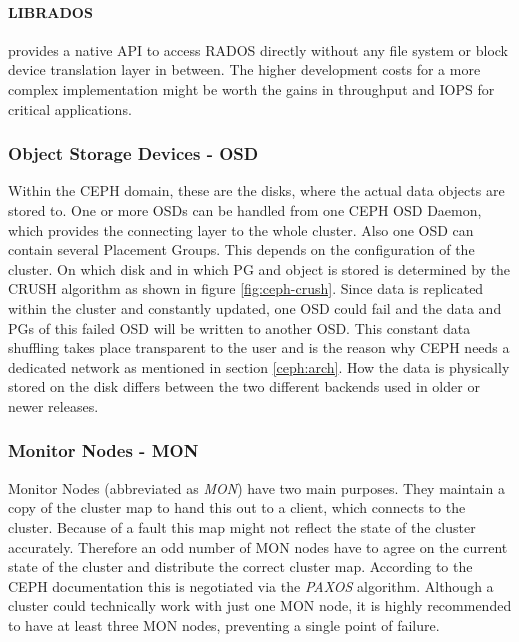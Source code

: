 \documentclass[titlepage, a4paper, 11pt]{scrartcl}
\begin{document}
                \paragraph{LIBRADOS} provides a native API to access RADOS directly without any file system or block device translation layer in
                between. The higher development costs for a more complex implementation might be worth the gains in throughput and IOPS
                for critical applications.

            \subsubsection{Object Storage Devices - OSD}

                Within the CEPH domain, these are the disks, where the actual data objects are stored to. 
                One or more OSDs can be handled from one CEPH OSD Daemon, which provides the connecting layer to the whole cluster.
                Also one OSD can contain several Placement Groups. This depends on the configuration of the cluster. On which disk and in which PG
                and object is stored is determined by the CRUSH algorithm as shown in figure \ref{fig:ceph-crush}.
                Since data is replicated within the cluster and constantly updated, one OSD could fail and the data and PGs of this failed
                OSD will be written to another OSD. This constant data shuffling takes place transparent to the user and is the reason why CEPH
                needs a dedicated network as mentioned in section \ref{ceph:arch}. How the data is physically stored on the disk differs between
                the two different backends used in older or newer releases.
            
            \subsubsection{Monitor Nodes - MON}

                Monitor Nodes (abbreviated as \textit{MON}) have two main purposes. They maintain a copy of the cluster map to hand this out 
                to a client, which connects to the cluster. Because of a fault this map might not reflect the state of the cluster accurately.
                Therefore an odd number of MON nodes have to agree on the current state of the cluster and distribute the correct cluster map.
                According to the CEPH documentation this is negotiated via the \textit{PAXOS} algorithm\cite{MONcephDocu}.
                Although a cluster could technically work with just one MON node, it is highly recommended to have at least three MON nodes,
                preventing a single point of failure.
\end{document}
